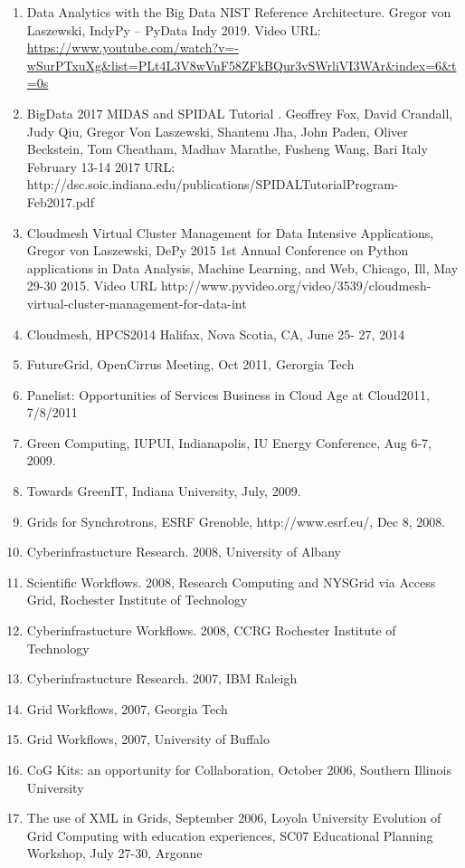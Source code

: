 \documentclass{article}
\begin{document}
\begin{enumerate}
\item  Data Analytics with the Big Data NIST Reference Architecture. Gregor von Laszewski, IndyPy – PyData Indy 2019. Video URL: \url{https://www.youtube.com/watch?v=-wSurPTxuXg&list=PLt4L3V8wVnF58ZFkBQur3vSWrliVI3WAr&index=6&t=0s}
\item  BigData 2017 MIDAS and SPIDAL Tutorial . Geoffrey Fox, David Crandall, Judy Qiu, Gregor Von Laszewski, Shantenu Jha, John Paden, Oliver Beckstein, Tom Cheatham, Madhav Marathe, Fusheng Wang, Bari Italy February 13-14 2017
URL: http://dsc.soic.indiana.edu/publications/SPIDALTutorialProgram-Feb2017.pdf
\item  Cloudmesh Virtual Cluster Management for Data Intensive Applications, Gregor von Laszewski, DePy 2015 1st Annual Conference on Python applications in Data Analysis, Machine Learning, and Web, Chicago, Ill, May 29-30 2015. Video URL http://www.pyvideo.org/video/3539/cloudmesh-virtual-cluster-management-for-data-int
\item  Cloudmesh, HPCS2014 Halifax, Nova Scotia, CA, June 25- 27, 2014
\item  FutureGrid, OpenCirrus Meeting, Oct 2011, Gerorgia Tech
\item  Panelist: Opportunities of Services Business in Cloud Age at Cloud2011, 7/8/2011 
\item  Green Computing,  IUPUI, Indianapolis, IU Energy Conference, Aug 6-7, 2009.
\item  Towards GreenIT, Indiana University, July, 2009. 
\item  Grids for Synchrotrons, ESRF Grenoble, http://www.esrf.eu/, Dec 8, 2008. 
\item  Cyberinfrastucture Research. 2008, University of Albany 
\item  Scientific Workflows. 2008, Research Computing and NYSGrid via Access Grid, Rochester Institute of Technology 
\item  Cyberinfrastucture Workflows. 2008, CCRG Rochester Institute of Technology 
\item  Cyberinfrastucture Research. 2007, IBM Raleigh 
\item  Grid Workflows, 2007, Georgia Tech
\item  Grid Workflows, 2007, University of Buffalo
\item  CoG Kits: an opportunity for Collaboration, October 2006, Southern Illinois University  
\item  The use of XML in Grids, September 2006, Loyola University Evolution of Grid Computing with education experiences, SC07 Educational Planning Workshop, July  27-30, Argonne 

\end{enumerate}
\end{document}
